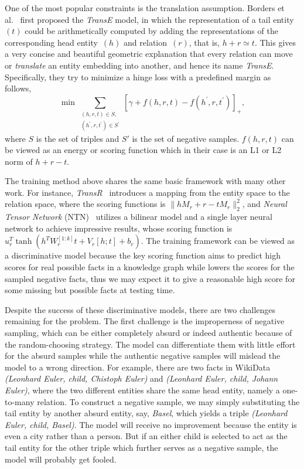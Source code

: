 \documentclass[twocolumn,a4paper,10pt,review,5p]{elsarticle}
\begin{document}

One of the most popular constraints is the translation assumption. Borders et al.~\cite{TransE2013} first proposed the \emph{TransE} model, in which the representation of a tail entity~$(t)$ could be arithmetically computed by adding the representations of the corresponding head entity~$(h)$ and relation~$(r)$, that is, $h + r \simeq t$. This gives a very concise and beautiful geometric explanation that every relation can move or \emph{translate} an entity embedding into another, and hence its name \emph{TransE}. Specifically, they try to minimize a hinge loss with a predefined margin as follows,
\[
    \min\sum_{\substack{(h, r, t)\in S,\\ (h^\prime, r, t^\prime)\in S^\prime }}
        {\left[\gamma + f(h, r, t) - f(h^\prime, r, t^\prime)\right]}_+,
\]
where $S$ is the set of triples and $S'$ is the set of negative samples. $f(h, r, t)$ can be viewed as an energy or scoring function which in their case is an L1 or L2 norm of $h + r - t$.

The training method above shares the same basic framework with many other work. For instance, \emph{TransR}~\cite{TransR2015} introduces a mapping from the entity space to the relation space, where the scoring functions is $\lVert h M_r + r - t M_r \rVert_2^2 $, and \emph{Neural Tensor Network} (NTN)~\cite{NTN} utilizes a bilinear model and a single layer neural network to achieve impressive results, whose scoring function is $u_r^T \tanh(h^T W_r^{[1:k]}t + V_r[h;t] + b_r)$. The training framework can be viewed as a discriminative model because the key scoring function aims to predict high scores for real possible facts in a knowledge graph while lowers the scores for the sampled negative facts, thus we may expect it to give a reasonable high score for some missing but possible facts at testing time.

Despite the success of these discriminative models, there are two challenges remaining for the problem.
The first challenge is the improperness of negative sampling, which can be either completely absurd or indeed authentic because of the random-choosing strategy.
The model can differentiate them with little effort for the absurd samples while the authentic negative samples will mislead the model to a wrong direction. For example, there are two facts in WikiData \emph{(Leonhard Euler, child, Chistoph Euler)} and \emph{(Leonhard Euler, child, Johann Euler)}, where the two different entities share the same head entity, namely a one-to-many relation. To construct a negative sample, we may simply substituting the tail entity by another absurd entity, say, \emph{Basel}, which yields a triple \emph{(Leonhard Euler, child, Basel)}. The model will receive no improvement because the entity is even a city rather than a person. But if an either child is selected to act as the tail entity for the other triple which further serves as a negative sample, the model will probably get fooled.
\end{document}
